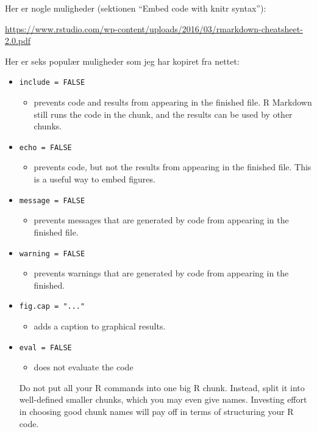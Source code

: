 \documentclass[
]{book}
\providecommand{\tightlist}{%
  \setlength{\itemsep}{0pt}\setlength{\parskip}{0pt}}
\begin{document}
Her er nogle muligheder (sektionen ``Embed code with knitr syntax''):

\url{https://www.rstudio.com/wp-content/uploads/2016/03/rmarkdown-cheatsheet-2.0.pdf}

Her er seks populær muligheder som jeg har kopiret fra nettet:

\begin{itemize}
\tightlist
\item
  \texttt{include\ =\ FALSE}

  \begin{itemize}
  \tightlist
  \item
    prevents code and results from appearing in the finished file. R Markdown still runs the code in the chunk, and the results can be used by other chunks.
  \end{itemize}
\item
  \texttt{echo\ =\ FALSE}

  \begin{itemize}
  \tightlist
  \item
    prevents code, but not the results from appearing in the finished file. This is a useful way to embed figures.
  \end{itemize}
\item
  \texttt{message\ =\ FALSE}

  \begin{itemize}
  \tightlist
  \item
    prevents messages that are generated by code from appearing in the finished file.
  \end{itemize}
\item
  \texttt{warning\ =\ FALSE}

  \begin{itemize}
  \tightlist
  \item
    prevents warnings that are generated by code from appearing in the finished.
  \end{itemize}
\item
  \texttt{fig.cap\ =\ "..."}

  \begin{itemize}
  \tightlist
  \item
    adds a caption to graphical results.
  \end{itemize}
\item
  \texttt{eval\ =\ FALSE}

  \begin{itemize}
  \tightlist
  \item
    does not evaluate the code
  \end{itemize}

  Do not put all your R commands into one big R chunk. Instead, split it into well-defined smaller chunks,
  which you may even give names. Investing effort in choosing good chunk names will pay off in terms of
  structuring your R code.
\end{itemize}
\end{document}
